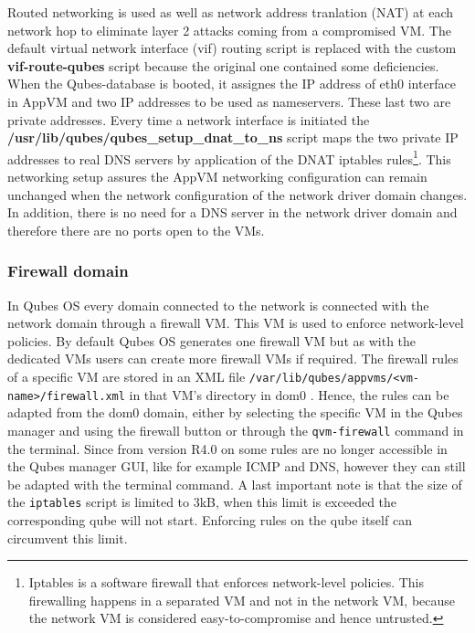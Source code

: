 \documentclass[runningheads,a4paper]{article}
\begin{document}
Routed networking is used as well as network address tranlation (NAT)
at each network hop to eliminate layer 2 attacks coming from a
compromised VM. The default virtual network interface (vif) routing
script is replaced with the custom \textbf{vif-route-qubes} script
because the original one contained some deficiencies. When the
Qubes-database is booted, it assignes the IP address of eth0 interface
in AppVM and two IP addresses to be used as nameservers. These last
two are private addresses. Every time a network interface is
initiated the \textbf{/usr/lib/qubes/qubes\_setup\_dnat\_to\_ns} script
maps the two private IP addresses to real DNS servers by application
of the DNAT iptables rules\footnote{Iptables is a software firewall that
enforces network-level policies. This firewalling happens in a
separated VM and not in the network VM, because the network VM is
considered easy-to-compromise and hence untrusted.}. This networking
setup assures the AppVM networking configuration can remain unchanged
when the network configuration of the network driver domain
changes. In addition, there is no need for a DNS server in the network
driver domain and therefore there are no ports open to the VMs.

\subsubsection{Firewall domain}

In Qubes OS every domain connected to the network is connected with
the network domain through a firewall VM. This VM is used to enforce
network-level policies. By default Qubes OS generates one firewall VM
but as with the dedicated VMs users can create more firewall VMs if
required. The firewall rules of a specific VM are stored in an XML
file \texttt{/var/lib/qubes/appvms/<vm-name>/firewall.xml} in that VM's
directory in dom0 . Hence, the rules can be adapted from the dom0
domain, either by selecting the specific VM in the Qubes manager and
using the firewall button or through the \texttt{qvm-firewall} command
in the terminal. Since from version R4.0 on some rules are no longer
accessible in the Qubes manager GUI, like for example ICMP and DNS,
however they can still be adapted with the terminal command. A last
important note is that the size of the \texttt{iptables} script is
limited to 3kB, when this limit is exceeded the corresponding qube will
not start. Enforcing rules on the qube itself can circumvent this
limit. %
\end{document}
